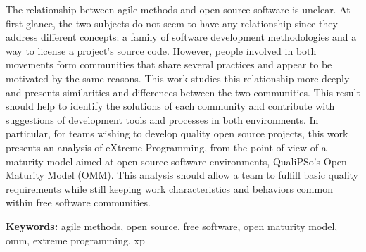 \documentclass[11pt,twoside,a4paper]{book}
\begin{document}
The relationship between agile methods and open source software is
unclear. At first glance, the two subjects do not seem to have any
relationship since they address different concepts: a family of
software development methodologies and a way to license a project's
source code. However, people involved in both movements form
communities that share several practices and appear to be motivated by
the same reasons. This work studies this relationship more deeply and
presents similarities and differences between the two
communities. This result should help to identify the solutions of each
community and contribute with suggestions of development tools and
processes in both environments. In particular, for teams wishing to
develop quality open source projects, this work presents an analysis
of eXtreme Programming, from the point of view of a maturity model
aimed at open source software environments, QualiPSo's Open Maturity
Model (OMM). This analysis should allow a team to fulfill basic
quality requirements while still keeping work characteristics and
behaviors common within free software communities.

\noindent \textbf{Keywords:} agile methods, open source, free
software, open maturity model, omm, extreme programming, xp

\tableofcontents %

\end{document}

